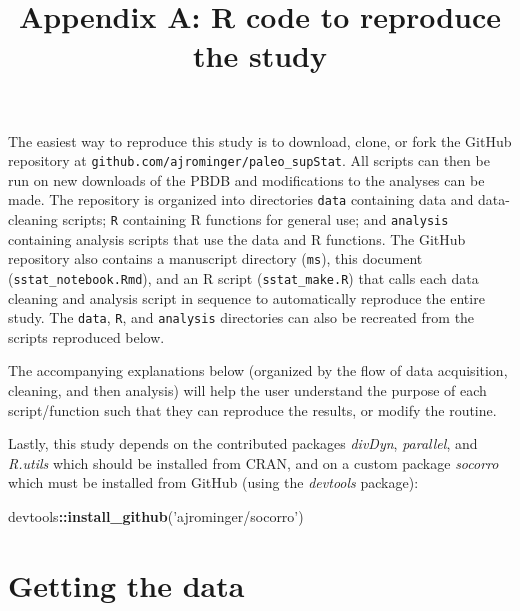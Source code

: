 \documentclass[]{article}
\title{Appendix A: R code to reproduce the study}
\author{}
\date{}
\newenvironment{Shaded}{\begin{snugshade}}{\end{snugshade}}
\newcommand{\KeywordTok}[1]{\textcolor[rgb]{0.13,0.29,0.53}{\textbf{#1}}}
\newcommand{\StringTok}[1]{\textcolor[rgb]{0.31,0.60,0.02}{#1}}
\newcommand{\OperatorTok}[1]{\textcolor[rgb]{0.81,0.36,0.00}{\textbf{#1}}}
\newcommand{\NormalTok}[1]{#1}
\begin{document}
\maketitle

\newcommand{\beginappendix}{%
  \setcounter{table}{0}
  \renewcommand{\thetable}{A\arabic{table}}%
  \setcounter{figure}{0}
  \renewcommand{\thefigure}{A\arabic{figure}}%
  \setcounter{section}{0}
  \renewcommand{\thesection}{A\arabic{section}}%
}

\beginappendix

The easiest way to reproduce this study is to download, clone, or fork
the GitHub repository at \texttt{github.com/ajrominger/paleo\_supStat}.
All scripts can then be run on new downloads of the PBDB and
modifications to the analyses can be made. The repository is organized
into directories \texttt{data} containing data and data-cleaning
scripts; \texttt{R} containing R functions for general use; and
\texttt{analysis} containing analysis scripts that use the data and R
functions. The GitHub repository also contains a manuscript directory
(\texttt{ms}), this document (\texttt{sstat\_notebook.Rmd}), and an R
script (\texttt{sstat\_make.R}) that calls each data cleaning and
analysis script in sequence to automatically reproduce the entire study.
The \texttt{data}, \texttt{R}, and \texttt{analysis} directories can
also be recreated from the scripts reproduced below.

The accompanying explanations below (organized by the flow of data
acquisition, cleaning, and then analysis) will help the user understand
the purpose of each script/function such that they can reproduce the
results, or modify the routine.

Lastly, this study depends on the contributed packages \emph{divDyn},
\emph{parallel}, and \emph{R.utils} which should be installed from CRAN,
and on a custom package \emph{socorro} which must be installed from
GitHub (using the \emph{devtools} package):

\begin{Shaded}
\begin{Highlighting}[]
\NormalTok{devtools}\OperatorTok{::}\KeywordTok{install_github}\NormalTok{(}\StringTok{'ajrominger/socorro'}\NormalTok{)}
\end{Highlighting}
\end{Shaded}

\section{Getting the data}\label{getting-the-data}
\end{document}
